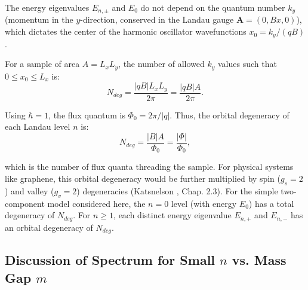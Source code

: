 \documentclass[11pt]{article}
\begin{document}
The energy eigenvalues $E_{n,\pm}$ and $E_0$ do not depend on the quantum number $k_y$ (momentum in the $y$-direction, conserved in the Landau gauge $\mathbf{A}=(0,Bx,0)$), which dictates the center of the harmonic oscillator wavefunctions $x_0 = k_y/(qB)$.

For a sample of area $A=L_x L_y$, the number of allowed $k_y$ values such that $0 \le x_0 \le L_x$ is:
\[ N_{deg} = \frac{|qB| L_x L_y}{2\pi} = \frac{|qB|A}{2\pi}. \]


Using $\hbar=1$, the flux quantum is $\Phi_0 = 2\pi/|q|$. Thus, the orbital degeneracy of each Landau level $n$ is:
\begin{equation}
N_{deg} = \frac{|B|A}{\Phi_0} = \frac{|\Phi|}{\Phi_0},
\end{equation}

which is the number of flux quanta threading the sample. For physical systems like graphene, this orbital degeneracy would be further multiplied by spin ($g_s=2$) and valley ($g_v=2$) degeneracies (Katsnelson \cite{Katsnelson2012Graphene}, Chap. 2.3). For the simple two-component model considered here, the $n=0$ level (with energy $E_0$) has a total degeneracy of $N_{deg}$. For $n \ge 1$, each distinct energy eigenvalue $E_{n,+}$ and $E_{n,-}$ has an orbital degeneracy of $N_{deg}$.


\subsection{Discussion of Spectrum for Small \texorpdfstring{$n$}{n} vs. Mass Gap \texorpdfstring{$m$}{m}}
\end{document}
